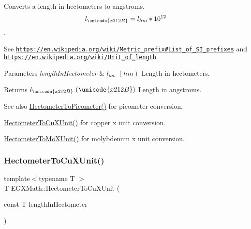 Converts a length in hectometers to angstroms. \[ l_{\unicode{x212B}}=l_{hm} * 10^{12} \]. 

See \href{https://en.wikipedia.org/wiki/Metric_prefix#List_of_SI_prefixes}{\tt https\+://en.\+wikipedia.\+org/wiki/\+Metric\+\_\+prefix\#\+List\+\_\+of\+\_\+\+S\+I\+\_\+prefixes} and \href{https://en.wikipedia.org/wiki/Unit_of_length}{\tt https\+://en.\+wikipedia.\+org/wiki/\+Unit\+\_\+of\+\_\+length} 
\begin{DoxyParams}{Parameters}
{\em length\+In\+Hectometer} & $ l_{hm}\ (hm)$ Length in hectometers. \\
\hline
\end{DoxyParams}
\begin{DoxyReturn}{Returns}
$ l_{\unicode{x212B}}\ (\unicode{x212B})$ Length in angstroms. 
\end{DoxyReturn}
\begin{DoxySeeAlso}{See also}
\mbox{\hyperlink{group___e_g_x_math-_conversions-_length_conversions-_s_i-_hectometer-_s_i_gaa45a09cd750ee4e48680332f0ce39f07}{Hectometer\+To\+Picometer()}} for picometer conversion. 

\mbox{\hyperlink{group___e_g_x_math-_conversions-_length_conversions-_s_i-_hectometer-_non-_s_i_ga5c1d570e3bec185a917f3987d45529be}{Hectometer\+To\+Cu\+X\+Unit()}} for copper x unit conversion. 

\mbox{\hyperlink{group___e_g_x_math-_conversions-_length_conversions-_s_i-_hectometer-_non-_s_i_gac2840604040746ae9a4c51fd1bb3e6f6}{Hectometer\+To\+Mo\+X\+Unit()}} for molybdenum x unit conversion. 
\end{DoxySeeAlso}
\mbox{\label{group___e_g_x_math-_conversions-_length_conversions-_s_i-_hectometer-_non-_s_i_ga5c1d570e3bec185a917f3987d45529be}} 
\subsubsection{\texorpdfstring{Hectometer\+To\+Cu\+X\+Unit()}{HectometerToCuXUnit()}}
{\footnotesize\ttfamily template$<$typename T $>$ \\
T E\+G\+X\+Math\+::\+Hectometer\+To\+Cu\+X\+Unit (\begin{DoxyParamCaption}\item[{const T}]{length\+In\+Hectometer }\end{DoxyParamCaption})}



